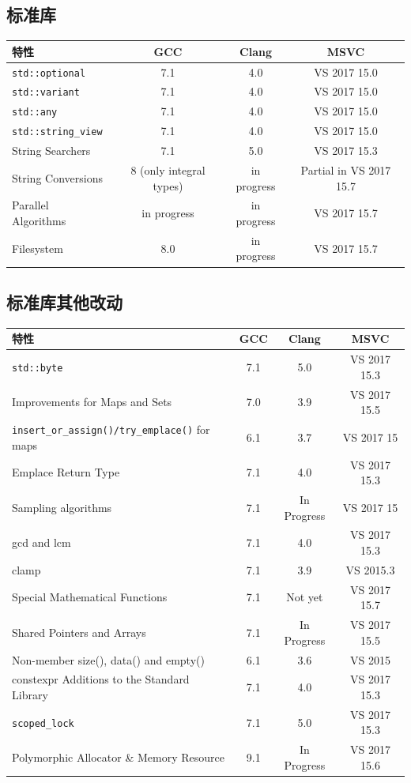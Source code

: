 \subsection{标准库}

\begin{table}[H]
\centering
\begin{tabularx}{\textwidth}{X c c c}
\toprule
特性 & GCC & Clang & MSVC \\
\midrule
\texttt{std::optional} & 7.1 & 4.0 & VS 2017 15.0 \\
\texttt{std::variant} & 7.1 & 4.0 & VS 2017 15.0 \\
\texttt{std::any} & 7.1 & 4.0 & VS 2017 15.0 \\
\texttt{std::string\_view} & 7.1 & 4.0 & VS 2017 15.0 \\
String Searchers & 7.1 & 5.0 & VS 2017 15.3 \\
String Conversions & 8 (only integral types) & in progress & Partial in VS 2017 15.7 \\
Parallel Algorithms & in progress & in progress & VS 2017 15.7 \\
Filesystem & 8.0 & in progress & VS 2017 15.7 \\
\bottomrule
\end{tabularx}
\end{table}

\subsection{标准库其他改动}

\begin{table}[H]
\centering
\begin{tabularx}{\textwidth}{X c c c}
\toprule
特性 & GCC & Clang & MSVC \\
\midrule
\texttt{std::byte} & 7.1 & 5.0 & VS 2017 15.3 \\
Improvements for Maps and Sets & 7.0 & 3.9 & VS 2017 15.5 \\
\texttt{insert\_or\_assign()/try\_emplace()} for maps & 6.1 & 3.7 & VS 2017 15 \\
Emplace Return Type & 7.1 & 4.0 & VS 2017 15.3 \\
Sampling algorithms & 7.1 & In Progress & VS 2017 15 \\
gcd and lcm & 7.1 & 4.0 & VS 2017 15.3 \\
clamp & 7.1 & 3.9 & VS 2015.3 \\
Special Mathematical Functions & 7.1 & Not yet & VS 2017 15.7 \\
Shared Pointers and Arrays & 7.1 & In Progress & VS 2017 15.5 \\
Non-member size(), data() and empty() & 6.1 & 3.6 & VS 2015 \\
constexpr Additions to the Standard Library & 7.1 & 4.0 & VS 2017 15.3 \\
\texttt{scoped\_lock} & 7.1 & 5.0 & VS 2017 15.3 \\
Polymorphic Allocator \& Memory Resource & 9.1 & In Progress & VS 2017 15.6 \\
\bottomrule
\end{tabularx}
\end{table}
